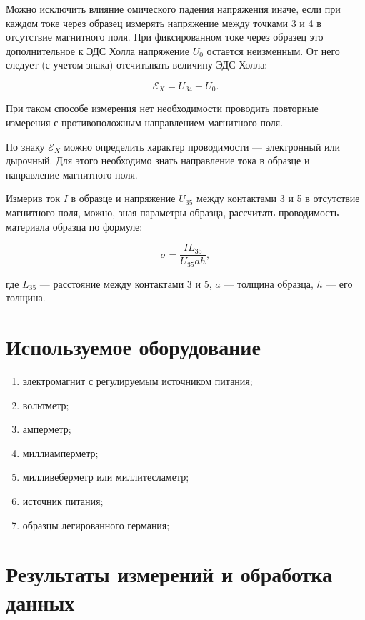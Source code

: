 \documentclass[a4paper, 12pt]{article}
\begin{document}
  	Можно исключить влияние омического падения напряжения иначе, если при каждом токе через образец измерять напряжение между точками 3 и 4 в отсутствие магнитного поля. При фиксированном токе через образец это дополнительное к ЭДС Холла напряжение $U_{0}$ остается неизменным. От него следует (с учетом
  	знака) отсчитывать величину ЭДС Холла: 
  	
  	$$\mathscr{E}_{X} = U_{34} - U_{0}.$$
  	
  	При таком способе измерения нет необходимости проводить повторные измерения с противоположным направлением магнитного поля.
  	
  	
  	По знаку $\mathscr{E}_{X}$ можно определить характер проводимости --- электронный или дырочный. Для этого необходимо знать направление тока в образце и направление
  	магнитного поля.
  	
  	Измерив ток $I$ в образце и напряжение $U_{35}$ между контактами 3 и 5 в отсутствие магнитного поля, можно, зная параметры образца, рассчитать проводимость материала образца по формуле:
  	
  \begin{equation}\label{sigma}
  	\sigma=\dfrac{IL_{35}}{U_{35}ah},
  \end{equation}
  	
где $L_{35}$ --- расстояние между контактами 3 и 5, $a$ --- толщина образца, $h$ --- его толщина.
  	
\section{Используемое оборудование}

\begin{enumerate}
    \item электромагнит с регулируемым источником питания;
    \item вольтметр;
    \item амперметр;
    \item миллиамперметр;
    \item милливеберметр или миллитесламетр;
    \item источник питания;
    \item образцы легированного германия;
\end{enumerate}

\section{Результаты измерений и обработка данных}
\end{document}
